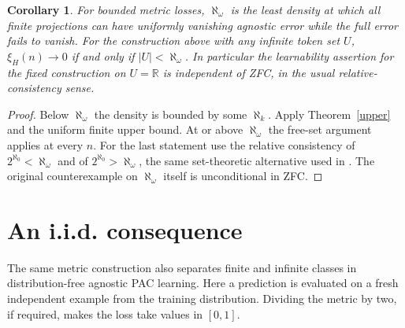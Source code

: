 \documentclass[11pt]{article}
\newtheorem{corollary}[theorem]{Corollary}
\newcommand{\err}{\xi}
\begin{document}
\begin{corollary}
For bounded metric losses, $\aleph_\omega$ is the least density at which all finite projections can have uniformly vanishing agnostic error while the full error fails to vanish. For the construction above with any infinite token set $U$, $\err_H(n)\to0$ if and only if $|U|<\aleph_\omega$. In particular the learnability assertion for the fixed construction on $U=\mathbb R$ is independent of ZFC, in the usual relative-consistency sense.
\end{corollary}
\begin{proof}
Below $\aleph_\omega$ the density is bounded by some $\aleph_k$. Apply Theorem~\ref{upper} and the uniform finite upper bound. At or above $\aleph_\omega$ the free-set argument applies at every $n$. For the last statement use the relative consistency of $2^{\aleph_0}<\aleph_\omega$ and of $2^{\aleph_0}>\aleph_\omega$, the same set-theoretic alternative used in \cite{emx}. The original counterexample on $\aleph_\omega$ itself is unconditional in ZFC.
\end{proof}

\section{An i.i.d. consequence}
The same metric construction also separates finite and infinite classes in distribution-free agnostic PAC learning. Here a prediction is evaluated on a fresh independent example from the training distribution. Dividing the metric by two, if required, makes the loss take values in $[0,1]$.
\end{document}
